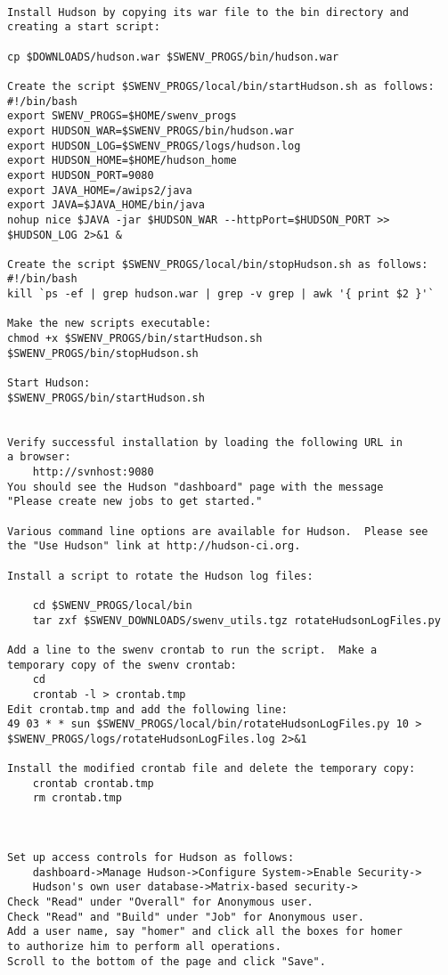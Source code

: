 \begin{verbatim}

Install Hudson by copying its war file to the bin directory and
creating a start script:

cp $DOWNLOADS/hudson.war $SWENV_PROGS/bin/hudson.war

Create the script $SWENV_PROGS/local/bin/startHudson.sh as follows:
#!/bin/bash
export SWENV_PROGS=$HOME/swenv_progs
export HUDSON_WAR=$SWENV_PROGS/bin/hudson.war
export HUDSON_LOG=$SWENV_PROGS/logs/hudson.log
export HUDSON_HOME=$HOME/hudson_home
export HUDSON_PORT=9080
export JAVA_HOME=/awips2/java
export JAVA=$JAVA_HOME/bin/java
nohup nice $JAVA -jar $HUDSON_WAR --httpPort=$HUDSON_PORT >> $HUDSON_LOG 2>&1 &

Create the script $SWENV_PROGS/local/bin/stopHudson.sh as follows:
#!/bin/bash
kill `ps -ef | grep hudson.war | grep -v grep | awk '{ print $2 }'`

Make the new scripts executable:
chmod +x $SWENV_PROGS/bin/startHudson.sh $SWENV_PROGS/bin/stopHudson.sh

Start Hudson:
$SWENV_PROGS/bin/startHudson.sh


Verify successful installation by loading the following URL in 
a browser:
    http://svnhost:9080
You should see the Hudson "dashboard" page with the message 
"Please create new jobs to get started."

Various command line options are available for Hudson.  Please see 
the "Use Hudson" link at http://hudson-ci.org.

Install a script to rotate the Hudson log files:

    cd $SWENV_PROGS/local/bin
    tar zxf $SWENV_DOWNLOADS/swenv_utils.tgz rotateHudsonLogFiles.py
    
Add a line to the swenv crontab to run the script.  Make a
temporary copy of the swenv crontab:
    cd
    crontab -l > crontab.tmp
Edit crontab.tmp and add the following line:
49 03 * * sun $SWENV_PROGS/local/bin/rotateHudsonLogFiles.py 10 > $SWENV_PROGS/logs/rotateHudsonLogFiles.log 2>&1

Install the modified crontab file and delete the temporary copy:
    crontab crontab.tmp
    rm crontab.tmp



Set up access controls for Hudson as follows:  
    dashboard->Manage Hudson->Configure System->Enable Security->
    Hudson's own user database->Matrix-based security->
Check "Read" under "Overall" for Anonymous user.
Check "Read" and "Build" under "Job" for Anonymous user.
Add a user name, say "homer" and click all the boxes for homer
to authorize him to perform all operations.
Scroll to the bottom of the page and click "Save".


\end{verbatim}
